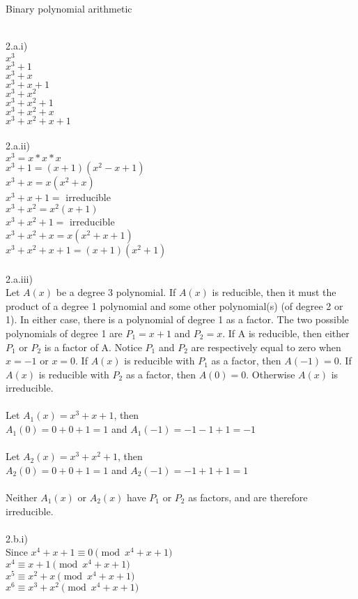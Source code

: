 \documentclass{assignment}
\newcommand\tab[1][0.5cm]{\hspace*{#1}}
\begin{document}
\begin{problemlist}
\pbitem Binary polynomial arithmetic
\begin{problem}
\begin{answer}
\\
2.a.i)\\
$x^3$\\
$x^3+1$\\
$x^3+x$\\
$x^3+x+1$\\
$x^3+x^2$\\
$x^3+x^2+1$\\
$x^3+x^2+x$\\
$x^3+x^2+x+1$\\
\\
2.a.ii)\\
$x^3=x*x*x$\\
$x^3+1=(x+1)(x^2-x+1)$\\
$x^3+x=x(x^2+x)$\\
$x^3+x+1=$ irreducible\\
$x^3+x^2=x^2(x+1)$\\
$x^3+x^2+1=$ irreducible\\
$x^3+x^2+x=x(x^2+x+1)$\\
$x^3+x^2+x+1=(x+1)(x^2+1)$\\
\\
2.a.iii)\\
Let $A(x)$ be a degree 3 polynomial.  If $A(x)$ is reducible, then it must the product of a degree 1 polynomial and some other polynomial(s) (of degree 2 or 1).  In either case, there is a polynomial of degree 1 as a factor.  The two possible polynomials of degree 1 are $P_1=x+1$ and $P_2=x$.  If A is reducible, then either $P_1$ or $P_2$ is a factor of A.  Notice $P_1$ and $P_2$ are respectively equal to zero when $x=-1$ or $x=0$.  If $A(x)$ is reducible with $P_1$ as a factor, then $A(-1)=0$.  If $A(x)$ is reducible with $P_2$ as a factor, then $A(0)=0$.  Otherwise $A(x)$ is irreducible.\\
\\
Let $A_1(x)=x^3+x+1$, then \\
\tab$A_1(0)=0+0+1=1$ and $A_1(-1)=-1-1+1=-1$\\
\\
Let $A_2(x)=x^3+x^2+1$, then \\
\tab$A_2(0)=0+0+1=1$ and $A_2(-1)=-1+1+1=1$\\
\\
Neither $A_1(x)$ or $A_2(x)$ have $P_1$ or $P_2$ as factors, and are therefore irreducible.\\
\\
2.b.i)\\
Since $x^4+x+1\equiv 0  \pmod{x^4+x+1}$\\
$x^4\equiv x+1  \pmod{x^4+x+1}$\\
$x^5\equiv x^2+x  \pmod{x^4+x+1}$\\
$x^6\equiv x^3+x^2  \pmod{x^4+x+1}$\\


\end{answer}
\end{problem}
\end{problemlist}
\end{document}
